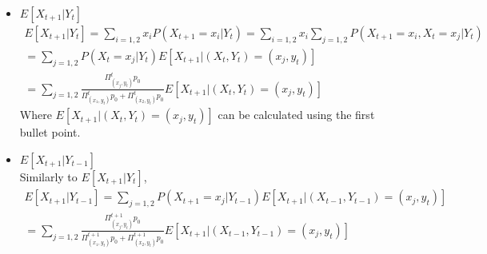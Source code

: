 \begin{itemize}
\begin{itemize}
    \item $E[X_{t+1}|Y_t]$
    \begin{gather*}
    E[X_{t+1}|Y_t] = \sum_{i=1,2} x_i P(X_{t+1} = x_i | Y_t)
    = \sum_{i=1,2} x_i \sum_{j=1,2} P(X_{t+1} = x_i, X_t = x_j | Y_t)\\
    =\sum_{j=1,2} P(X_t = x_j|Y_t) E[X_{t+1}|(X_t,Y_t)=(x_j,y_t)]\\
    =\sum_{j=1,2} \frac{\Pi^t_{(x_j,y_t)} p_0}{\Pi^t_{(x_1,y_t)} p_0 + \Pi^t_{(x_2,y_t)} p_0}  E[X_{t+1}|(X_t,Y_t)=(x_j,y_t)]
    \end{gather*}
    Where $E[X_{t+1}|(X_t,Y_t)=(x_j,y_t)]$ can be calculated using the first bullet point.
    
    \item $E[X_{t+1}|Y_{t-1}]$\\
    Similarly to $E[X_{t+1}|Y_t]$,
    \begin{gather*}
    E[X_{t+1}|Y_{t-1}]=\sum_{j=1,2} P(X_{t+1} = x_j|Y_{t-1}) E[X_{t+1}|(X_{t-1},Y_{t-1})=(x_j,y_t)]\\
    =\sum_{j=1,2} \frac{\Pi^{t+1}_{(x_j,y_t)} p_0}{\Pi^{t+1}_{(x_1,y_t)} p_0 + \Pi^{t+1}_{(x_2,y_t)} p_0}  E[X_{t+1}|(X_{t-1},Y_{t-1})=(x_j,y_t)]
    \end{gather*}
\end{itemize}


\end{itemize}
